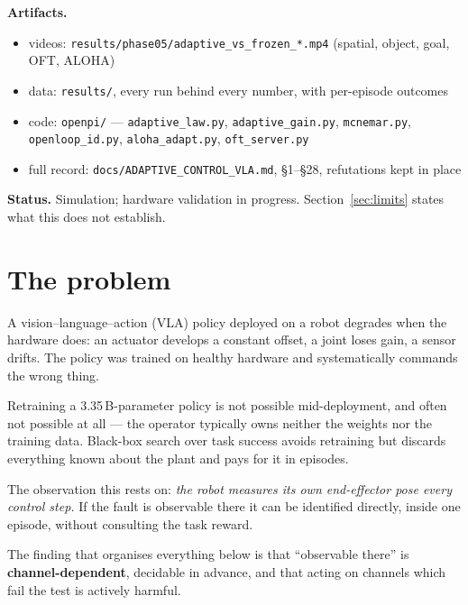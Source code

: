 \documentclass[11pt,a4paper]{article}
\newcommand{\code}[1]{\texttt{\small #1}}
\begin{document}
\vspace{0.4em}
\noindent\textbf{Artifacts.}
\begin{itemize}[leftmargin=1.5em,itemsep=0pt,topsep=2pt]
  \item videos: \code{results/phase05/adaptive\_vs\_frozen\_*.mp4} (spatial, object, goal, OFT, ALOHA)
  \item data: \code{results/}, every run behind every number, with per-episode outcomes
  \item code: \code{openpi/} --- \code{adaptive\_law.py}, \code{adaptive\_gain.py}, \code{mcnemar.py},
        \code{openloop\_id.py}, \code{aloha\_adapt.py}, \code{oft\_server.py}
  \item full record: \code{docs/ADAPTIVE\_CONTROL\_VLA.md}, \S1--\S28, refutations kept in place
\end{itemize}

\noindent\textbf{Status.} Simulation; hardware validation in progress.
Section~\ref{sec:limits} states what this does not establish.

\tableofcontents

\section{The problem}

A vision--language--action (VLA) policy deployed on a robot degrades when the
hardware does: an actuator develops a constant offset, a joint loses gain, a
sensor drifts. The policy was trained on healthy hardware and systematically
commands the wrong thing.

Retraining a 3.35\,B-parameter policy is not possible mid-deployment, and often
not possible at all --- the operator typically owns neither the weights nor the
training data. Black-box search over task success avoids retraining but discards
everything known about the plant and pays for it in episodes.

The observation this rests on: \emph{the robot measures its own end-effector
pose every control step.} If the fault is observable there it can be identified
directly, inside one episode, without consulting the task reward.

The finding that organises everything below is that ``observable there'' is
\textbf{channel-dependent}, decidable in advance, and that acting on channels
which fail the test is actively harmful.

\end{document}
